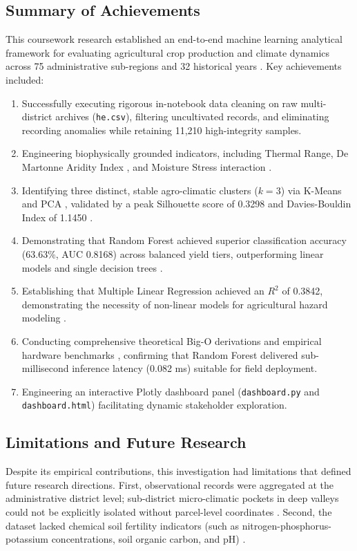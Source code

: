\documentclass[conference]{IEEEtran}
\begin{document}
\subsection{Summary of Achievements}
This coursework research established an end-to-end machine learning analytical framework for evaluating agricultural crop production and climate dynamics across 75 administrative sub-regions and 32 historical years \cite{dhakal2023}. Key achievements included:
\begin{enumerate}
    \item Successfully executing rigorous in-notebook data cleaning on raw multi-district archives (\texttt{he.csv}), filtering uncultivated records, and eliminating recording anomalies while retaining 11,210 high-integrity samples.
    \item Engineering biophysically grounded indicators, including Thermal Range, De Martonne Aridity Index \cite{demartonne1926}, and Moisture Stress interaction \cite{schlenker2009}.
    \item Identifying three distinct, stable agro-climatic clusters ($k=3$) via K-Means \cite{macqueen1967} and PCA \cite{hotelling1933}, validated by a peak Silhouette score of 0.3298 \cite{rousseeuw1987} and Davies-Bouldin Index of 1.1450 \cite{davies1979}.
    \item Demonstrating that Random Forest \cite{breiman2001} achieved superior classification accuracy (63.63\%, AUC 0.8168) across balanced yield tiers, outperforming linear models \cite{cortes1995, hastie2009} and single decision trees \cite{quinlan1986}.
    \item Establishing that Multiple Linear Regression \cite{hoerl1970} achieved an $R^2$ of 0.3842, demonstrating the necessity of non-linear models for agricultural hazard modeling \cite{crane2018}.
    \item Conducting comprehensive theoretical Big-O derivations and empirical hardware benchmarks \cite{hastie2009}, confirming that Random Forest delivered sub-millisecond inference latency (0.082 ms) suitable for field deployment.
    \item Engineering an interactive Plotly dashboard panel (\texttt{dashboard.py} and \texttt{dashboard.html}) facilitating dynamic stakeholder exploration.
\end{enumerate}

\subsection{Limitations and Future Research}
Despite its empirical contributions, this investigation had limitations that defined future research directions. First, observational records were aggregated at the administrative district level; sub-district micro-climatic pockets in deep valleys could not be explicitly isolated without parcel-level coordinates \cite{fernandez2021}. Second, the dataset lacked chemical soil fertility indicators (such as nitrogen-phosphorus-potassium concentrations, soil organic carbon, and pH) \cite{crane2018}.
\end{document}
